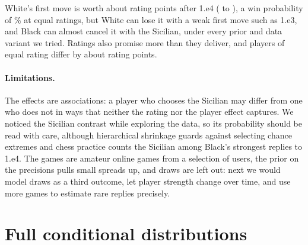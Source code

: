 \documentclass[12pt]{article}
\begin{document}
White's first move is worth about \advantageEfour{} rating points after 1.e4 (\advantageEfourLow{} to \advantageEfourHigh), a win probability of \pWhiteEfour\% at equal ratings, but White can lose it with a weak first move such as 1.e3, and Black can almost cancel it with the Sicilian, under every prior and data variant we tried. Ratings also promise more than they deliver, and players of equal rating differ by about \sigmaPlayerPoints{} rating points.

\paragraph{Limitations.} The effects are associations: a player who chooses the Sicilian may differ from one who does not in ways that neither the rating nor the player effect captures. We noticed the Sicilian contrast while exploring the data, so its probability should be read with care, although hierarchical shrinkage guards against selecting chance extremes \citep{gelman2012multiple} and chess practice counts the Sicilian among Black's strongest replies to 1.e4. The games are amateur online games from a selection of users, the prior on the precisions pulls small spreads up, and draws are left out: next we would model draws as a third outcome, let player strength change over time, and use more games to estimate rare replies precisely.





\appendix
{}

\section{Full conditional distributions}\label{app:conditionals}
\end{document}
